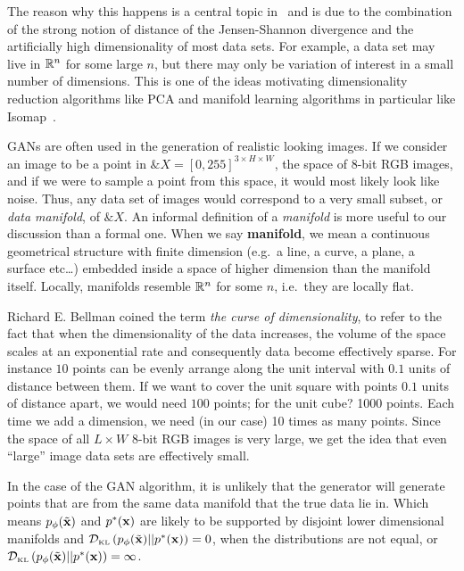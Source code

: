
The reason why this happens is a central topic
in~\cite{ref:arjovsky-towards-2017} and is due to the combination of
the strong notion of distance of the Jensen-Shannon divergence and the
artificially high dimensionality of most data sets.  For example, a
data set may live in $\mathbb{R}^n$ for some large $n$, but there may only be
variation of interest in a small number of dimensions. This is one of
the ideas motivating dimensionality reduction algorithms like PCA and
manifold learning algorithms in particular like
Isomap~\cite{ref:tenenbaum-2000}.

GANs are often used in the generation of realistic looking images. If
we consider an image to be a point in
$\&X = {[0, 255]}^{3 \times H \times W}$, the space of 8-bit RGB
images, and if we were to sample a point from this space, it would
most likely look like noise. Thus, any data set of images would
correspond to a very small subset, or \textit{data manifold}, of
$\&X$. An informal definition of a \textit{manifold} is more useful to
our discussion than a formal one. When we say \textbf{manifold}, we
mean a continuous geometrical structure with finite dimension (e.g.\ a
line, a curve, a plane, a surface etc\dots) embedded inside a space of
higher dimension than the manifold itself.  Locally, manifolds
resemble $\mathbb{R}^n$ for some $n$, i.e.\ they are locally flat.

Richard E. Bellman coined the term \textit{the curse of
  dimensionality}, to refer to the fact that when the dimensionality
of the data increases, the volume of the space scales at an
exponential rate and consequently data become effectively sparse. For
instance $10$ points can be evenly arrange along the unit interval
with $0.1$ units of distance between them. If we want to cover the
unit square with points $0.1$ units of distance apart, we would need
$100$ points; for the unit cube? 1000 points. Each time we add a
dimension, we need (in our case) 10 times as many points. Since the
space of all $L \times W$ 8-bit RGB images is very large, we get the
idea that even ``large'' image data sets are effectively small.

In the case of the GAN algorithm, it is unlikely that the generator
will generate points that are from the same data manifold that the
true data lie in. Which means $p_{\phi}(\tilde{\mathbf{x}})$ and $p^*(\mathbf{x})$ are likely to be
supported by disjoint lower dimensional manifolds and
$\mathcal{D}_{\text{\tiny KL}}\left( p_{\phi}(\tilde{\mathbf{x}}) \middle| \middle| p^*(\mathbf{x}) \right) = 0$, when the distributions are not equal, or
$\mathcal{D}_{\text{\tiny KL}}\left( p_{\phi}(\tilde{\mathbf{x}}) \middle| \middle| p^*(\mathbf{x}) \right) = \infty$.

